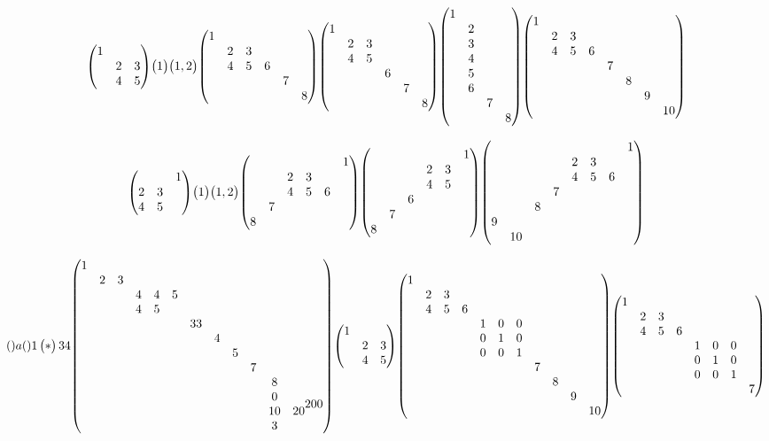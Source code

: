 \documentclass{article}
\begin{document}
\[
  \mqty(\dmat{1,2&3\\4&5})
  \mqty(\dmat 1)
  \mqty(\dmat 1,2)
  \mqty(\dmat{1,2&3\\4&5&6,7,8})
  \mqty(\dmat{1,2&3\\4&5,6,7,8})
  \mqty(\dmat{1,2\\3\\4\\5\\6,7,8})
  \mqty(\dmat{1,2&3\\4&5&6,7,8,\dmat{9,10}})
\]


\[
  \mqty(\admat{1,2&3\\4&5})
  \mqty(\admat 1)
  \mqty(\admat 1,2)
  \mqty(\admat{1,2&3\\4&5&6,7,8})
  \mqty(\admat{1,2&3\\4&5,6,7,8})
  \mqty(\admat{1,2&3\\4&5&6,7,8,\dmat{9,10}})
\]

\[ 
  \mqty a
  \mqty1
  \pmqty* 34
  \mqty(\dmat{1,2&3,4&4&5\\4&5,33,4,5,7,8\\0\\10&20\\3,200}) 
  \mqty(\dmat{1,2&3\\4&5}) 
  \mqty(\dmat{1,2&3\\4&5&6,\imat{3},7,8,\dmat{9,10}})
  \mqty(\mqty{1}\\ & \mqty{2 & 3\\ 4 & 5 & 6}\\ & & \mqty{\imat{3}} \\ & & & \mqty{7})
\]

\newpage
\end{document}
